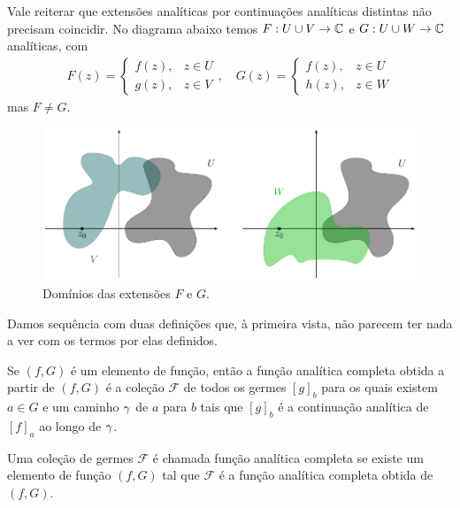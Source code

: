 \begin{observacao}
        Vale reiterar que extensões analíticas por continuações analíticas distintas
        não precisam coincidir. No diagrama abaixo temos $F: U\cup V\to\mathbb{C}$
        e $G:U\cup W\to\mathbb{C}$ analíticas, com
        \begin{align*}
            F(z) = 
            \begin{cases}
                f(z), & z\in U \\
                g(z), & z\in V
            \end{cases}, 
            \quad
            G(z) = 
            \begin{cases}
                f(z), & z\in U \\
                h(z), & z\in W
            \end{cases}
        \end{align*}
        mas $F\neq G$.
        \begin{figure}[H]\centering
            \includegraphics{
                Figuras/aula 3 slide 11.pdf
            }
            \caption{
                Domínios das extensões $F$ e $G$.
            }
        \end{figure}
    \end{observacao}

    Damos sequência com duas definições que, à primeira vista, não parecem ter 
    nada a ver com os termos por elas definidos.

    \begin{definicao}
    \label{def-funcao-analitica-completa}
        Se $(f,G)$ é um elemento de função, então a função analítica completa obtida
        a partir de $(f,G)$ é a coleção $\mathcal{F}$ de todos os germes $[g]_b$ 
        para os quais existem $a\in G$ e um caminho $\gamma$ de $a$ para $b$ 
        tais que $[g]_b$ é a continuação analítica de $[f]_a$ ao longo de $\gamma$.
    \end{definicao}
    \begin{definicao}
        Uma coleção de germes $\mathcal{F}$ é chamada função analítica completa se
        existe um elemento de função $(f,G)$ tal que $\mathcal{F}$ é a função analítica
        completa obtida de $(f,G)$.
    \end{definicao}

